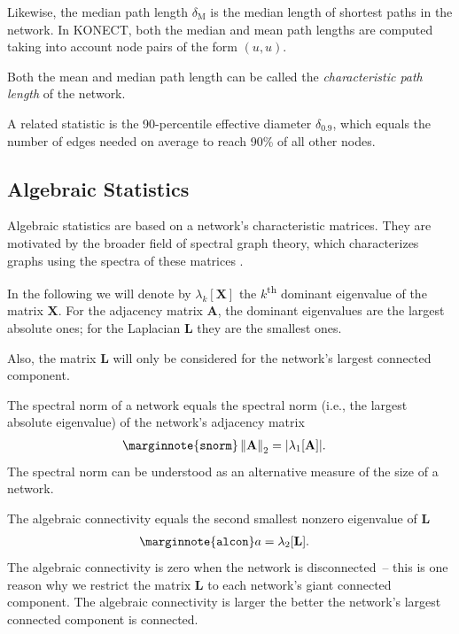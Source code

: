 \documentclass{article}
\begin{document}
Likewise, the median path length $\delta_{\mathrm M}$ is the median
length of shortest paths in the network.  In KONECT, both the median and
mean path lengths are computed taking into account node pairs of the
form $(u,u)$.

Both the mean and median path length can be called the
\emph{characteristic path length} of the network.

A related statistic is the 90-percentile effective diameter
$\delta_{0.9}$, which equals the number of edges needed on average to
reach 90\% of all other nodes.

\subsection{Algebraic Statistics}

Algebraic statistics are based on a network's characteristic matrices.
They are motivated by the broader field of spectral graph theory, which
characterizes graphs using the spectra of these matrices \citep{b285}.

In the following we will denote by $\lambda_k[\mathbf X]$ the
$k$\textsuperscript{th} dominant eigenvalue of the matrix $\mathbf X$.
For the adjacency matrix $\mathbf A$, the dominant eigenvalues are the
largest absolute ones; for the Laplacian $\mathbf L$ they are the
smallest ones.

Also, the matrix $\mathbf L$ will only be considered for the network's
largest connected component.

The spectral norm of a network equals the spectral norm (i.e., the
largest absolute eigenvalue) of the network's adjacency matrix
\begin{align}
  \marginnote{\texttt{snorm}} 
  \left\| \mathbf A \right\|_2
  &= 
  | \lambda_1[\mathbf A] | .
\end{align}
The spectral norm can be understood as an alternative measure of the
size of a network.

The algebraic connectivity equals the second smallest nonzero eigenvalue
of $\mathbf L$ \citep{b652}
\begin{align}
  \marginnote{\texttt{alcon}} a &= \lambda_2[\mathbf L].
\end{align}
The algebraic connectivity is zero when the network is disconnected~--
this is one reason why we restrict the matrix $\mathbf L$ to each
network's giant connected component.  The algebraic connectivity is
larger the better the network's largest connected component is
connected.
\end{document}
